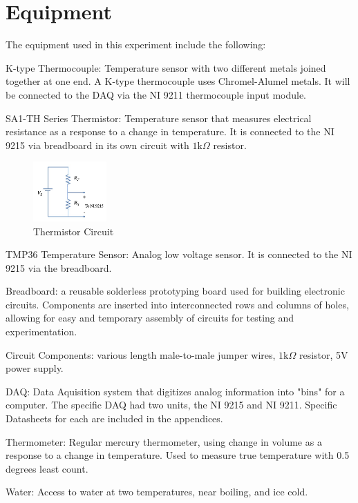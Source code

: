 \documentclass{article}
\begin{document}
\section{Equipment}
The equipment used in this experiment include the following:  

K-type Thermocouple:  Temperature sensor with two different metals joined together at one end.  A K-type thermocouple uses Chromel-Alumel metals.  It will be connected to the DAQ via the NI 9211 thermocouple input module.  

SA1-TH Series Thermistor:  Temperature sensor that measures electrical resistance as a response to a change in temperature.  It is connected to the NI 9215 via breadboard in its own circuit with $1\text{k}\Omega$ resistor.
\begin{figure}[H]
    \centering
    \includegraphics[width=0.25\textwidth]{Lab 2/lab2images/thermistor_circuit.jpg}
    \caption{Thermistor Circuit}
\end{figure}

TMP36 Temperature Sensor: Analog low voltage sensor.  It is connected to the NI 9215 via the breadboard.  

Breadboard: a reusable solderless prototyping board used for building electronic circuits. Components are inserted into interconnected rows and columns of holes, allowing for easy and temporary assembly of circuits for testing and experimentation.

Circuit Components:  various length male-to-male jumper wires, $1\text{k}\Omega$ resistor, 5V power supply.

DAQ:  Data Aquisition system that digitizes analog information into "bins" for a computer.  The specific DAQ had two units, the NI 9215 and NI 9211.  Specific Datasheets for each are included in the appendices.  

Thermometer:  Regular mercury thermometer, using change in volume as a response to a change in temperature.  Used to measure true temperature with 0.5 degrees least count.  

Water:  Access to water at two temperatures, near boiling, and ice cold. 
\end{document}
